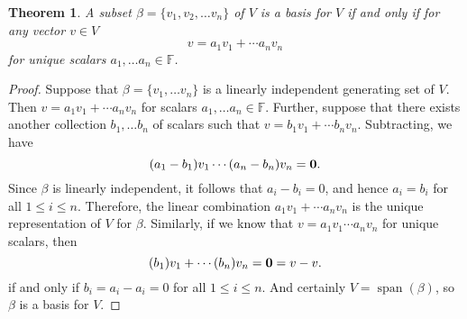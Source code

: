 \documentclass[oneside, 12pt]{book}
\DeclareMathOperator{\spn}{span}
\newtheorem{thm}{Theorem}[section]
\theoremstyle{definition}
\begin{document}
\begin{thm}
\label{thm_uniqbas}
A subset $\beta=\{v_{1},v_{2}, \dots v_{n}\}$ of $V$ is a basis for $V$ if and only if for any vector $v \in V$ \[v=a_{1}v_{1}+\cdots a_{n}v_{n}\] for unique scalars $a_{1}, \dots a_{n} \in \mathbb{F}$.
\end{thm}
\begin{proof}
Suppose that $\beta=\{v_{1}, \dots v_{n}\}$ is a linearly independent generating set of $V$. Then $v=a_{1}v_{1}+\cdots a_{n}v_{n}$ for scalars $a_{1}, \dots a_{n} \in \mathbb{F}$. Further, suppose that there exists another collection $b_{1}, \dots b_{n}$ of scalars such that $v=b_{1}v_{1}+\cdots b_{n}v_{n}$. Subtracting, we have \[(a_{1}-b_{1})v_{1}\cdots (a_{n}-b_{n})v_{n}=\bold{0}.\] Since $\beta$ is linearly independent, it follows that $a_{i}-b_{i}=0$, and hence $a_{i}=b_{i}$ for all $1 \leq i\leq n$. Therefore, the linear combination $a_{1}v_{1}+\cdots a_{n}v_{n}$ is the unique representation of $V$ for $\beta$. Similarly, if we know that $v=a_{1}v_{1}\cdots a_{n}v_{n}$ for unique scalars, then \[(b_{1})v_{1}+\cdots(b_{n})v_{n}=\bold{0}=v-v.\] if and only if $b_{i}=a_{i}-a_{i}=0$ for all $1 \leq i \leq n$. And certainly $V=\spn(\beta)$, so $\beta$ is a basis for $V$.
\end{proof}
\end{document}
